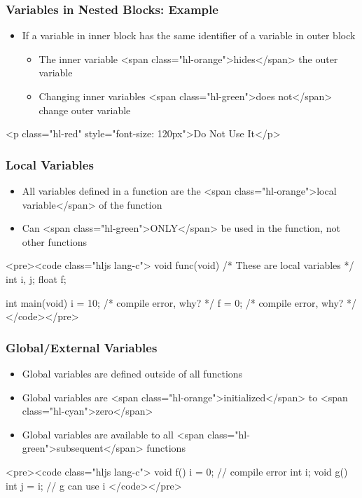 \documentclass{../c-lecture}
\begin{document}
\begin{frame}
  \frametitle{Variables in Nested Blocks: Example}
  \begin{itemize}
    \item
      If a variable in inner block has the same identifier of a variable in
      outer block

    \begin{itemize}
      \item
        The inner variable <span class="hl-orange">hides</span> the outer
        variable

      \item
        Changing inner variables
        <span class="hl-green">does not</span> change outer variable

    \end{itemize}
  \end{itemize}
  <p class="hl-red" style="font-size: 120px">Do Not Use It</p>
\end{frame}
\begin{frame}
  \frametitle{Local Variables}
  \begin{itemize}
    \item
      All variables defined in a function are the
      <span class="hl-orange">local variable</span> of the function

    \item
      Can <span class="hl-green">ONLY</span> be used in the function, not other
      functions

  \end{itemize}
  <pre><code class="hljs lang-c">
void func(void){
  /* These are local variables */
  int i, j;
  float f;
}

int main(void){
  i = 10; /* compile error, why? */
  f = 0; /* compile error, why? */
}
  </code></pre>
\end{frame}
\begin{frame}
  \frametitle{Global/External Variables}
  \begin{itemize}
    \item Global variables are defined outside of all functions
    \item
      Global variables are <span class="hl-orange">initialized</span> to
      <span class="hl-cyan">zero</span>

    \item
      Global variables are available to all
      <span class="hl-green">subsequent</span> functions

  \end{itemize}
  <pre><code class="hljs lang-c">
void f(){
   i = 0; // compile error
}
int i;
void g(){
   int j = i; // g can use i
}
  </code></pre>
\end{frame}
\end{document}
